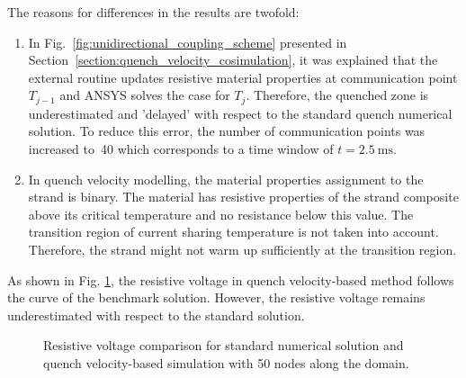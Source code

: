 The reasons for differences in the results are twofold:
\begin{enumerate}
    \item In Fig.~\ref{fig:unidirectional_coupling_scheme} presented in Section~\ref{section:quench_velocity_cosimulation}, it was explained that the external routine updates resistive material properties at communication point $T_{j-1}$ and ANSYS solves the case for $T_{j}$. Therefore, the quenched zone is underestimated and 'delayed' with respect to the standard quench numerical solution. To reduce this error, the number of communication points was increased to~40 which corresponds to a time window of $t=2.5~\text{ms}$. 
    \item In quench velocity modelling, the material properties assignment to the strand is binary. The material has resistive properties of the strand composite above its critical temperature and no resistance below this value. The transition region of current sharing temperature is not taken into account. Therefore, the strand might not warm up sufficiently at the transition region.
\end{enumerate}

As shown in Fig. \ref{fig: q_vel_modelling_res_volt_benchmarking}, the resistive voltage in quench velocity-based method follows the curve of the benchmark solution. However, the resistive voltage remains underestimated with respect to the standard solution.

\begin{figure}[H]
\centering
    \caption{Resistive voltage comparison for standard numerical solution and quench velocity-based simulation with 50 nodes along the domain.}
    \label{fig: q_vel_modelling_res_volt_benchmarking}
\end{figure}

